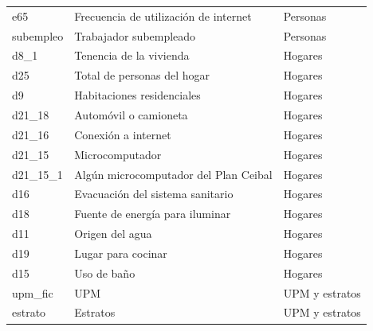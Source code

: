 \documentclass[12pt,twoside,spanish,a4paper]{book}\usepackage[]{graphicx}\usepackage[]{color}
\begin{document}
\begin{appendix}
\begin{longtable}{p{1in}p{3.7in}p{1.3in}}
  e65 & Frecuencia de utilización de internet & Personas \\ 
  subempleo & Trabajador subempleado & Personas \\ 
  d8\_1 & Tenencia de la vivienda & Hogares \\ 
  d25 & Total de personas del hogar & Hogares \\ 
  d9 & Habitaciones residenciales & Hogares \\ 
  d21\_18 & Automóvil o camioneta & Hogares \\ 
  d21\_16 & Conexión a internet & Hogares \\ 
  d21\_15 & Microcomputador & Hogares \\ 
  d21\_15\_1 & Algún microcomputador del Plan Ceibal & Hogares \\ 
  d16 & Evacuación del sistema sanitario & Hogares \\ 
  d18 & Fuente de energía para iluminar & Hogares \\ 
  d11 & Origen del agua & Hogares \\ 
  d19 & Lugar para cocinar & Hogares \\ 
  d15 & Uso de baño & Hogares \\ 
  upm\_fic & UPM & UPM y estratos \\ 
  estrato & Estratos & UPM y estratos \\ 
  \hline
\end{longtable}

\end{appendix}
\end{document}
